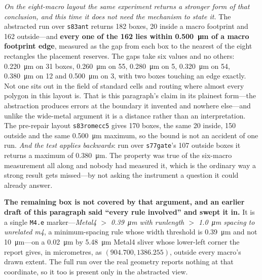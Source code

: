 \documentclass[11pt,a4paper]{article}
\begin{document}
\emph{On the eight-macro layout the same experiment returns a stronger
form of that conclusion, and this time it does not need the mechanism to
state it.} The abstracted run over \texttt{s83ant} returns 182 boxes, 20
inside a macro footprint and 162 outside---and \textbf{every one of the
162 lies within \SI{0.500}{\micro\meter} of a macro footprint edge},
measured as the gap from each box to the nearest of the eight
rectangles the placement reserves. The gaps take six values and no
others: \SI{0.220}{\micro\meter} on 31 boxes,
\SI{0.260}{\micro\meter} on 55, \SI{0.280}{\micro\meter} on 5,
\SI{0.320}{\micro\meter} on 54, \SI{0.380}{\micro\meter} on 12 and
\SI{0.500}{\micro\meter} on 3, with two boxes touching an edge exactly.
Not one sits out in the field of standard cells and routing where almost
every polygon in this layout is. That is this paragraph's claim in its
plainest form---the abstraction produces errors at the boundary it
invented and nowhere else---and unlike the wide-metal argument it is a
distance rather than an interpretation. The pre-repair layout
\texttt{s83romecc5} gives 170 boxes, the same 20 inside, 150 outside and
the same \SI{0.500}{\micro\meter} maximum, so the bound is not an
accident of one run. \emph{And the test applies backwards}: run over
\texttt{s77gate}'s 107 outside boxes it returns a maximum of
\SI{0.380}{\micro\meter}. The property was true of the six-macro
measurement all along and nobody had measured it, which is the ordinary
way a strong result gets missed---by not asking the instrument a
question it could already answer.

\textbf{The remaining box is not covered by that argument, and an
earlier draft of this paragraph said ``every rule involved'' and swept
it in.} It is a single \texttt{M4.e} marker---\emph{Metal4 $>$
\SI{0.39}{\micro\meter} with runlength $>$ \SI{1.0}{\micro\meter}
spacing to unrelated m4}, a minimum-spacing rule whose width threshold
is \SI{0.39}{\micro\meter} and not \SI{10}{\micro\meter}---on a
\SI{0.02}{\micro\meter} by \SI{5.48}{\micro\meter} Metal4 sliver whose
lower-left corner the report gives, in micrometres, as
$(904.700, 1386.255)$, outside every macro's drawn
extent. The full run over the real geometry reports nothing at that
coordinate, so it too is present only in the abstracted view.
\end{document}
